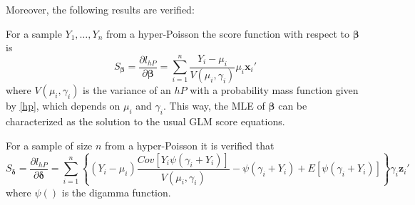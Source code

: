 Moreover, the following results are verified:
\begin{res}\label{res_beta}
For a sample $ Y_1, \dots, Y_n $ from a hyper-Poisson the score function with respect to $ \boldsymbol{\beta} $ is
\begin{equation}\label{scorebeta}
    S_{\boldsymbol{\beta}} = \frac{\partial l_{hP}}{\partial \boldsymbol{\beta}} = \sum_{i=1}^n \frac{Y_i - \mu_i}{V\left(\mu_i,\gamma_i\right)} \mu_i \mathbf{x}_i'
\end{equation}
where $ V\left(\mu_i,\gamma_i\right) $ is the variance of an $hP$ with a probability mass function given by \eqref{hp}, which depends on $\mu_i$ and $\gamma_i$. This way, the MLE of $\boldsymbol{\beta}$ can be characterized as the solution to the usual GLM score equations.
\end{res}

\begin{res}\label{res_delta}
For a sample of size  $ n $ from a hyper-Poisson it is verified that
\begin{equation}\label{scoredelta}
    S_{\boldsymbol{\delta}}= \frac{\partial l_{hP}}{\partial\boldsymbol{\delta}} = \sum_{i=1}^n \left\{\left(Y_i - \mu_i\right)\frac{Cov \left[Y_i \psi\left(\gamma_i+ Y_i\right) \right]}{V\left(\mu_i,\gamma_i\right)} - \psi\left(\gamma_i+Y_i\right) + E \left[ \psi\left(\gamma_i+Y_i\right) \right]  \right\} \gamma_i \mathbf{z}_i'
\end{equation}
where $\psi()$ is the digamma function.
\end{res}

